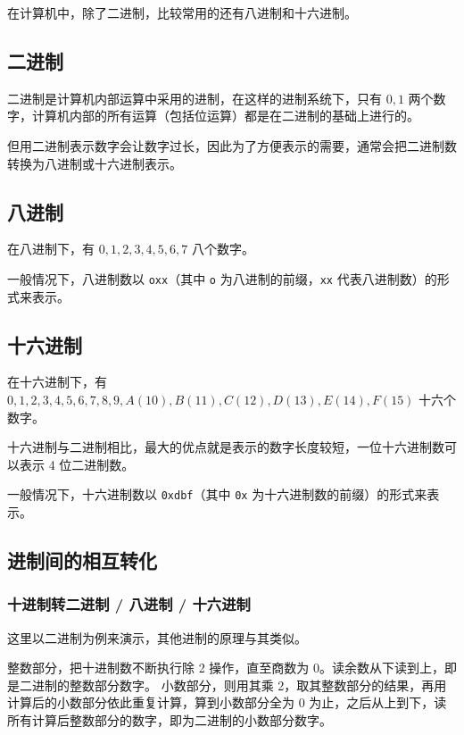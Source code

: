 
在计算机中，除了二进制，比较常用的还有八进制和十六进制。

\subsection{二进制}

二进制是计算机内部运算中采用的进制，在这样的进制系统下，只有 $0,1$ 两个数字，计算机内部的所有运算（包括位运算）都是在二进制的基础上进行的。

但用二进制表示数字会让数字过长，因此为了方便表示的需要，通常会把二进制数转换为八进制或十六进制表示。

\subsection{八进制}

在八进制下，有 $0,1,2,3,4,5,6,7$ 八个数字。

一般情况下，八进制数以 \texttt{oxx}（其中 \texttt{o} 为八进制的前缀，\texttt{xx} 代表八进制数）的形式来表示。

\subsection{十六进制}

在十六进制下，有 $0,1,2,3,4,5,6,7,8,9,A(10),B(11),C(12),D(13),E(14),F(15)$ 十六个数字。

十六进制与二进制相比，最大的优点就是表示的数字长度较短，一位十六进制数可以表示 4 位二进制数。

一般情况下，十六进制数以 \texttt{0xdbf}（其中 \texttt{0x} 为十六进制数的前缀）的形式来表示。

\subsection{进制间的相互转化}

\subsubsection{十进制转二进制 / 八进制 / 十六进制}

这里以二进制为例来演示，其他进制的原理与其类似。

整数部分，把十进制数不断执行除 2 操作，直至商数为 0。读余数从下读到上，即是二进制的整数部分数字。 小数部分，则用其乘 2，取其整数部分的结果，再用计算后的小数部分依此重复计算，算到小数部分全为 0 为止，之后从上到下，读所有计算后整数部分的数字，即为二进制的小数部分数字。

